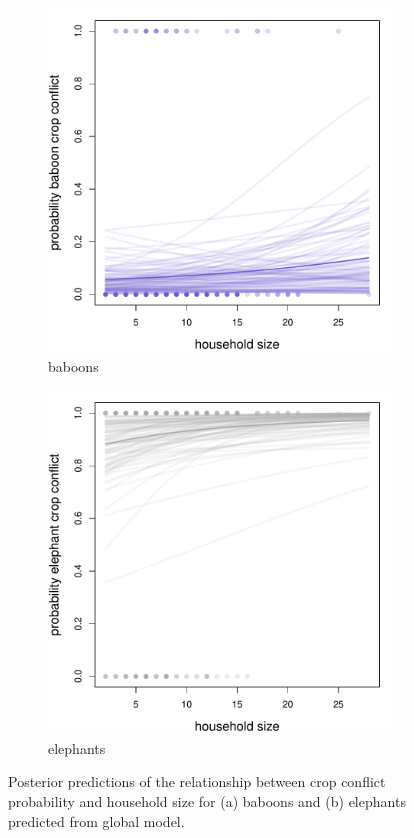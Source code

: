 \documentclass[12pt,]{article}
\begin{document}
\begin{figure}[H]
  \centering
	\begin{subfigure}[b]{0.49\textwidth}
	\includegraphics[width=\textwidth]{Figures/hhsize_crop_global_conflict_bab.pdf} 
    \caption{baboons}
   	    \label{fig:cropHHbab}
\end{subfigure}
\begin{subfigure}[b]{0.49\textwidth}
	\includegraphics[width=\textwidth]{Figures/hhsize_crop_global_conflict_ele.pdf}  
    \caption{elephants}
  	\label{fig:cropHHele}
\end{subfigure}
\caption{Posterior predictions of the relationship between crop conflict probability and household size for (a) baboons and (b) elephants predicted from global model.}
\end{figure}
\end{document}
